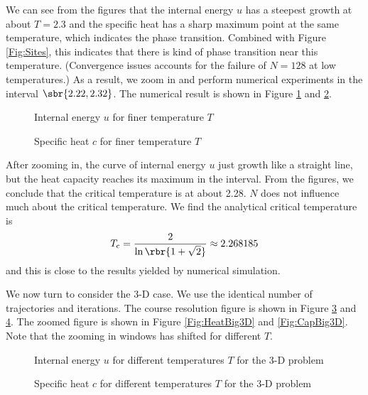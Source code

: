 \documentclass[english, nochinese]{pnote}
\begin{document}
We can see from the figures that the internal energy $u$ has a steepest growth at about $ T = 2.3 $ and the specific heat has a sharp maximum point at the same temperature, which indicates the phase transition. Combined with Figure \ref{Fig:Sites}, this indicates that there is kind of phase transition near this temperature. (Convergence issues accounts for the failure of $ N = 128 $ at low temperatures.) As a result, we zoom in and perform numerical experiments in the interval $ \sbr{ 2.22, 2.32 } $. The numerical result is shown in Figure \ref{Fig:HeatBig} and \ref{Fig:CapBig}.

\begin{figure}[htbp]
\centering
\scalebox{0.725}{}
\caption{Internal energy $u$ for finer temperature $T$}
\label{Fig:HeatBig}
\end{figure}

\begin{figure}[htbp]
\centering
\scalebox{0.725}{}
\caption{Specific heat $c$ for finer temperature $T$}
\label{Fig:CapBig}
\end{figure}

After zooming in, the curve of internal energy $u$ just growth like a straight line, but the heat capacity reaches its maximum in the interval. From the figures, we conclude that the critical temperature is at about 2.28. $N$ does not influence much about the critical temperature. We find the analytical critical temperature is
\begin{equation}
T_{\text{c}} = \frac{2}{ \ln \rbr{ 1 + \sqrt{2} } } \approx 2.268185
\end{equation}
and this is close to the results yielded by numerical simulation.

We now turn to consider the 3-D case. We use the identical number of trajectories and iterations. The course resolution figure is shown in Figure \ref{Fig:HeatSmall3D} and \ref{Fig:CapSmall3D}. The zoomed figure is shown in Figure \ref{Fig:HeatBig3D} and \ref{Fig:CapBig3D}. Note that the zooming in windows has shifted for different $T$.

\begin{figure}[htbp]
\centering
\scalebox{0.725}{}
\caption{Internal energy $u$ for different temperatures $T$ for the 3-D problem}
\label{Fig:HeatSmall3D}
\end{figure}

\begin{figure}[htbp]
\centering
\scalebox{0.725}{}
\caption{Specific heat $c$ for different temperatures $T$ for the 3-D problem}
\label{Fig:CapSmall3D}
\end{figure}
\end{document}
